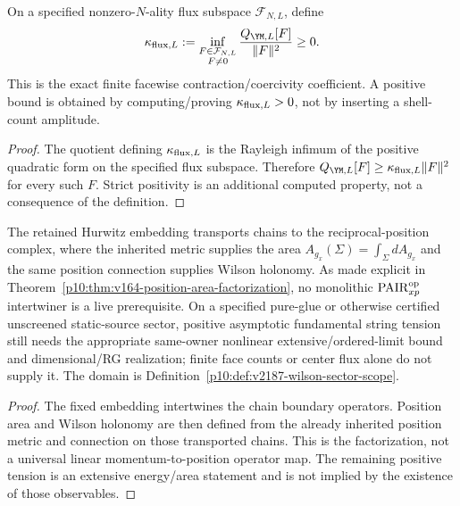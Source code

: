 \documentclass[12pt,a4paper]{article}
\begin{document}
\begin{theorem}
\label{p10:thm:scalar-shell-contraction-nonzero-nality}
On a specified nonzero-\(N\)-ality flux subspace \(\mathcal F_{N,L}\), define
\begin{equation}
\kappa_{{\rm flux},L}:=
\inf_{\substack{F\in\mathcal F_{N,L}\\F\ne0}}
\frac{Q_{\YM,L}[F]}{\|F\|^2}\ge0.
\end{equation}
This is the exact finite facewise contraction/coercivity coefficient.  A positive bound is obtained by computing/proving \(\kappa_{{\rm flux},L}>0\), not by inserting a shell-count amplitude.
\end{theorem}
\begin{proof}
The quotient defining $\kappa_{{\rm flux},L}$ is the Rayleigh infimum of the positive quadratic form on the specified flux subspace.  Therefore $Q_{\YM,L}[F]\ge\kappa_{{\rm flux},L}\|F\|^2$ for every such $F$.  Strict positivity is an additional computed property, not a consequence of the definition.
\end{proof}

\begin{theorem}
\label{p10:thm:hurwitz-reciprocal-area-string-tension}
The retained Hurwitz embedding transports chains to the reciprocal-position
complex, where the inherited metric supplies the area
\(A_{g_x}(\Sigma)=\int_\Sigma dA_{g_x}\) and the same position connection
supplies Wilson holonomy.  As made explicit in
Theorem~\ref{p10:thm:v164-position-area-factorization}, no monolithic
\(\mathrm{PAIR}_{xp}^{\rm op}\) intertwiner is a live prerequisite.
On a specified pure-glue or otherwise certified unscreened static-source
sector, positive asymptotic fundamental string tension still needs the
appropriate same-owner nonlinear extensive/ordered-limit bound and
dimensional/RG realization; finite face counts or center flux alone do not
supply it.  The domain is Definition~\ref{p10:def:v2187-wilson-sector-scope}.
\end{theorem}
\begin{proof}
The fixed embedding intertwines the chain boundary operators.  Position
area and Wilson holonomy are then defined from the already inherited
position metric and connection on those transported chains.  This is the
factorization, not a universal linear momentum-to-position operator map.
The remaining positive tension is an extensive energy/area statement and
is not implied by the existence of those observables.
\end{proof}
\end{document}
